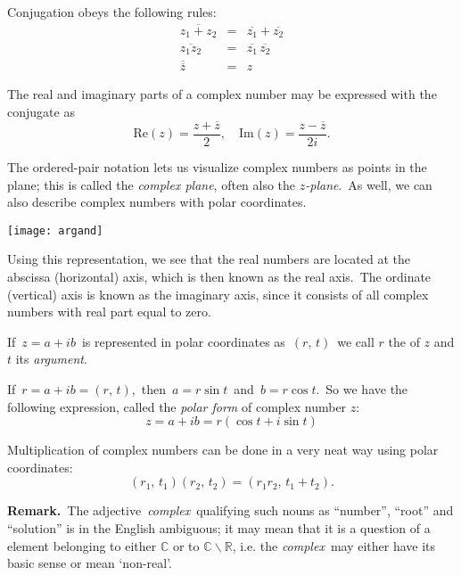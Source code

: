 \documentclass[12pt]{article}
\begin{document}
Conjugation obeys the following rules:
\begin{eqnarray*}
\overline{z_1+z_2}&=&\overline{z_1}+\overline{z_2}\\
\overline{z_1z_2}&=&\overline{z_1}\,\overline{z_2}\\
\overline{\overline{z}}&=& z
\end{eqnarray*}

The real and imaginary parts of a complex number may be expressed with the conjugate as
$$\mbox{Re}(z) = \frac{z+\overline{z}}{2}, \quad \mbox{Im}(z) = \frac{z-\overline{z}}{2i}.$$


The ordered-pair notation lets us visualize complex numbers as points in the plane; this is called the {\em complex plane}, often also the {\em $z$-plane}.\, As well, we can also describe complex numbers with polar coordinates.
\begin{center}
\texttt{[image: argand]}
\end{center}
Using this representation, we see that the real numbers are located at the abscissa (horizontal) axis, which is then known as the real axis.\, The ordinate (vertical) axis is known as the imaginary axis, since it consists of all complex numbers with real part equal to zero.

If\, $z = a+ib$\, is represented in polar coordinates as\, $(r,\,t)$\, we call $r$ the  of $z$ and $t$ its \emph{argument}.

If\, $r = a+ib = (r,\,t)$,\, then\, $a = r\sin{t}$\, and\, $b = r\cos{t}$.\, So we have the following expression, called the {\em polar form} of complex number $z$:
$$z = a+ib = r(\cos{t}+i\sin{t})$$

Multiplication of complex numbers can be done in a very neat way using polar coordinates:
$$(r_1,\,t_1)(r_2,\,t_2) = (r_1r_2,\,t_1\!+\!t_2).$$

\textbf{Remark.}\, The adjective\, {\em complex}\, qualifying such nouns as ``number'', ``root'' and ``solution'' is in the English  ambiguous; it may mean that it is a question of a element belonging to either $\mathbb{C}$ or to $\mathbb{C}\!\smallsetminus\!\mathbb{R}$, i.e. the  {\em complex}\, may either have its basic sense or mean `non-real'.
\end{document}
